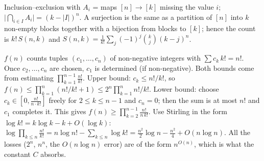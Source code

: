 \documentclass[11pt,a4paper]{article}
\begin{document}
Inclusion--exclusion with \(A_i\) = maps \([n]\to[k]\) missing the value \(i\); \(\lvert\bigcap_{i\in I}A_i\rvert=(k-\lvert I\rvert)^n\).
A surjection is the same as a partition of \([n]\) into \(k\) non-empty blocks together with a bijection from blocks to \([k]\); hence the count is \(k!\,S(n,k)\) and \(S(n,k)=\frac1{k!}\sum_{j}(-1)^j\binom{k}{j}(k-j)^n\).

\(f(n)\) counts tuples \((c_1,\dots,c_n)\) of non-negative integers with \(\sum c_k\,k!=n!\). Once \(c_2,\dots,c_n\) are chosen, \(c_1\) is determined (if non-negative). Both bounds come from estimating \(\prod_{k=1}^{n-1}\frac{n!}{k!}\).
Upper bound: \(c_k\le n!/k!\), so \(f(n)\le\prod_{k=1}^{n}(n!/k!+1)\le 2^n\prod_{k=1}^{n}n!/k!\). Lower bound: choose \(c_k\in[0,\frac{n!}{n\cdot k!}]\) freely for \(2\le k\le n-1\) and \(c_n=0\); then the sum is at most \(n!\) and \(c_1\) completes it. This gives \(f(n)\ge\prod_{k=2}^{n-1}\frac{n!}{n\,k!}\).
Use Stirling in the form \(\log k!=k\log k-k+O(\log k)\): \(\log\prod_{k\le n}\frac{n!}{k!}=n\log n!-\sum_{k\le n}\log k!=\frac{n^2}2\log n-\frac{n^2}4+O(n\log n)\). All the losses (\(2^n\), \(n^{n}\), the \(O(n\log n)\) error) are of the form \(n^{O(n)}\), which is what the constant \(C\) absorbs.
\end{document}
